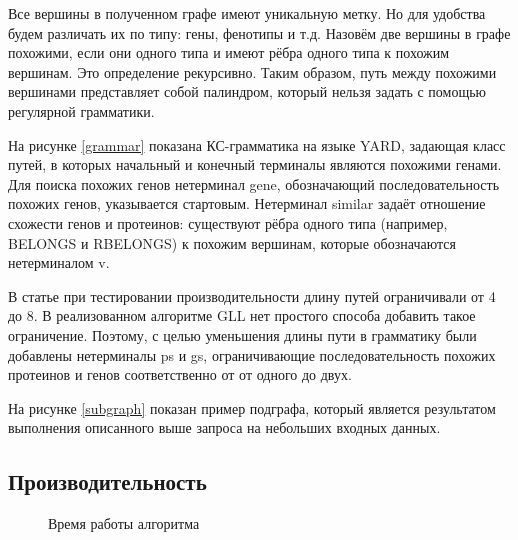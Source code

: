 \documentclass[14pt]{matmex-diploma}
\begin{document}
Все вершины в полученном графе имеют уникальную метку. Но для удобства будем различать их по типу: гены, фенотипы и т.д. Назовём две вершины в графе похожими, если они одного типа и имеют рёбра одного типа к похожим вершинам. Это определение рекурсивно. Таким образом, путь между похожими вершинами представляет собой палиндром, который нельзя задать с помощью регулярной грамматики. 

На рисунке \ref{grammar} показана КС-грамматика на языке YARD, задающая класс путей, в которых начальный и конечный терминалы являются похожими генами. Для поиска похожих генов нетерминал gene, обозначающий последовательность похожих генов, указывается стартовым. Нетерминал similar задаёт отношение схожести генов и протеинов: существуют рёбра одного типа (например, BELONGS и RBELONGS) к похожим вершинам, которые обозначаются нетерминалом v.

В статье \cite{subgraph} при тестировании производительности длину путей ограничивали от 4 до 8. В реализованном алгоритме GLL нет простого способа добавить такое ограничение. Поэтому, с целью уменьшения длины пути в грамматику были добавлены нетерминалы ps и gs, ограничивающие последовательность похожих протеинов и генов соответственно от от одного до двух.

На рисунке \ref{subgraph} показан пример подграфа, который является результатом выполнения описанного выше запроса на небольших входных данных.

\subsection{Производительность}

\begin{figure}
\begin{center}
\end{center}
\caption{Время работы алгоритма}
\label{time}
\end{figure}
\end{document}
